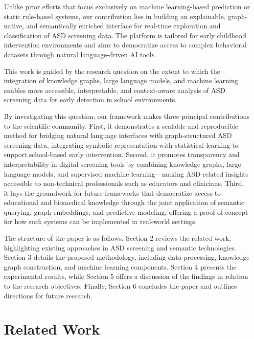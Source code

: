 \documentclass[pdflatex,sn-basic]{sn-jnl}%
\theoremstyle{thmstyleone}%
\theoremstyle{thmstyletwo}%
\theoremstyle{thmstylethree}%
\begin{document}
  Unlike prior efforts that focus exclusively on machine learning-based prediction or static rule-based systems, our contribution
  lies in building an explainable, graph-native, and semantically enriched interface for real-time exploration and classification
  of ASD screening data. The platform is tailored for early childhood intervention environments and aims to democratize access to
  complex behavioral datasets through natural language-driven AI tools.

  This work is guided by the research question on the extent to which the integration of knowledge graphs, large language models,
  and machine learning enables more accessible, interpretable, and context-aware analysis of ASD screening data for early
  detection in school environments.

  By investigating this question, our framework makes three principal contributions to the scientific community. First, it
  demonstrates a scalable and reproducible method for bridging natural language interfaces with graph-structured ASD screening
  data, integrating symbolic representation with statistical learning to support school-based early intervention. Second, it
  promotes transparency and interpretability in digital screening tools by combining knowledge graphs, large language models, and
  supervised machine learning—making ASD-related insights accessible to non-technical professionals such as educators and
  clinicians. Third, it lays the groundwork for future frameworks that democratize access to educational and biomedical knowledge
  through the joint application of semantic querying, graph embeddings, and predictive modeling, offering a proof-of-concept for
  how such systems can be implemented in real-world settings.

  The structure of the paper is as follows. Section 2 reviews the related work, highlighting existing approaches in ASD screening
  and semantic technologies. Section 3 details the proposed methodology, including data processing, knowledge graph construction,
  and machine learning components. Section 4 presents the experimental results, while Section 5 offers a discussion of the
  findings in relation to the research objectives. Finally, Section 6 concludes the paper and outlines directions for future
  research.


  \section {Related Work}
\end{document}
